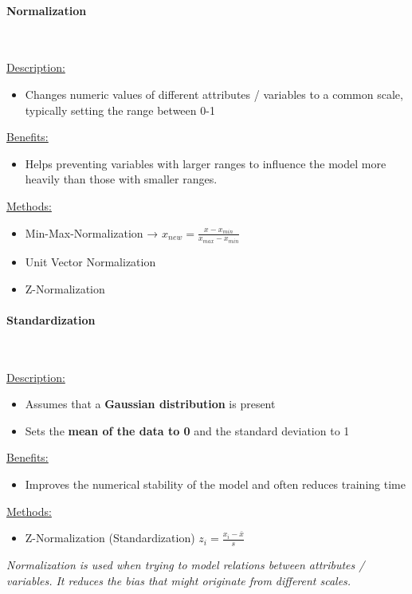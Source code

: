 \documentclass[12pt, a4paper, oneside, justified]{article}
\begin{document}
\paragraph*{Normalization}~{}

\underline{Description:}
\begin{itemize}
    \item Changes numeric values of different attributes / variables to a common scale, typically setting the range between 0-1
\end{itemize}

\underline{Benefits:}
\begin{itemize}
    \item Helps preventing variables with larger ranges to influence the model more heavily than those with smaller ranges.
\end{itemize}

\underline{Methods:}
\begin{itemize}
    \item Min-Max-Normalization → $x_{new}=\frac{x-x_{min}}{x_{max}-x_{min}}$
    \item Unit Vector Normalization
    \item Z-Normalization
\end{itemize}

\paragraph*{Standardization}~{}

\underline{Description:}
\begin{itemize}
    \item Assumes that a \textbf{Gaussian distribution} is present
    \item Sets the \textbf{mean of the data to 0} and the standard deviation to 1
\end{itemize}

\underline{Benefits:}
\begin{itemize}
    \item Improves the numerical stability of the model and often reduces training time
\end{itemize}

\underline{Methods:}
\begin{itemize}
    \item Z-Normalization (Standardization) $z_i=\frac{x_i-\bar x}{s}$
\end{itemize}
 
\textit{Normalization is used when trying to model relations between attributes / variables. It reduces the bias that might originate from different scales.}
\end{document}
